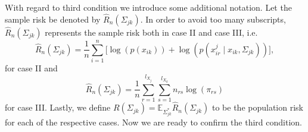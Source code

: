 With regard to third condition we introduce some additional notation. Let the sample risk be denoted by $\hat{R}_n(\Sigma_{jk})$. In order to avoid too many subscripts, $\hat{R}_n(\Sigma_{jk})$ represents the sample risk both in case II and case III, i.e. 
\begin{equation*}
    \hat{R}_n(\Sigma_{jk}) = \frac{1}{n} \sum_{i=1}^n \big[\log(p(x_{ik})) + \log(p(x^j_{ir} \mid x_{ik}, \Sigma_{jk}))\big],
\end{equation*}
for case II and
\begin{equation*}
    \hat{R}_n(\Sigma_{jk}) = \frac{1}{n} \sum_{r=1}^{l_{X_{j}}}\sum_{s=1}^{l_{X_{k}}} n_{rs} \log(\pi_{rs})    
\end{equation*}
for case III. Lastly, we define $R(\Sigma_{jk}) = \mathbb{E}_{\Sigma_{jk}^*}\hat{R}_n(\Sigma_{jk})$ to be the population risk for each of the respective cases. Now we are ready to confirm the third condition.   
